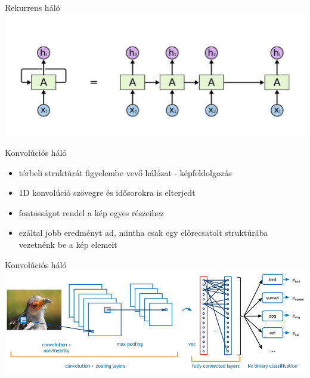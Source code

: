 \documentclass[bigger]{beamer}
\begin{document}
\begin{frame}{Rekurrens háló}
	\centering
	\includegraphics[width=.99\textwidth]{fig/rnn}
\end{frame}

\begin{frame}{Konvolúciós háló}
    \begin{itemize}
        \item térbeli struktúrát figyelembe vevő hálózat - képfeldolgozás
        \item 1D konvolúció szövegre és idősorokra is elterjedt
        \item fontosságot rendel a kép egyes részeihez
        \item ezáltal jobb eredményt ad, mintha csak egy előrecsatolt struktúrába vezetnénk be a kép elemeit
    \end{itemize}
\end{frame}

\begin{frame}{Konvolúciós háló}
\centering
\includegraphics[width=.99\textwidth]{fig/cnn}
\end{frame}
\end{document}
